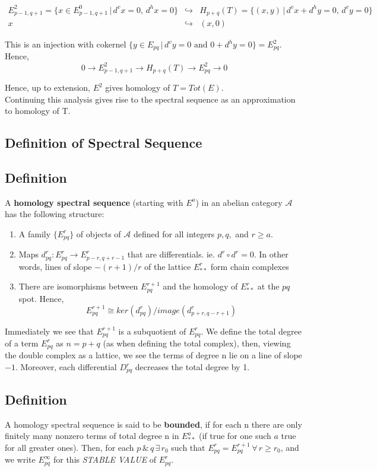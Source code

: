 \begin{eqnarray}
\nonumber E^2_{p-1,q+1} = \{x\in E^0_{p-1,q+1}\, |\, d^v x = 0,\,
d^h x = 0 \} &\hookrightarrow& H_{p+q} (T) = \{(x,y)\, | \, d^v x
+ d^h y =
0,\, d^v y = 0 \}\\
\nonumber x &\hookrightarrow& (x,0)
\end{eqnarray}

This is an injection with cokernel $\{ y\in E_{pq}\, |\, d^v y = 0
\text{ and } 0+d^h y = 0\} = E^2_{pq}$. Hence,
$$0\rightarrow E^2_{p-1,q+1} \rightarrow H_{p+q}(T) \rightarrow
E^2_{pq}\rightarrow 0$$

Hence, up to extension, $E^2$ gives homology of $T=Tot(E)$.\\
Continuing this analysis gives rise to the spectral sequence as an
approximation to homology of T.


\subsection{Definition of Spectral Sequence}\label{df4.5.2}

\subsection*{Definition}
A \textbf{homology spectral sequence} (starting with $E^a$) in an
abelian category $\mathcal A$ has the following structure:
\begin{enumerate}
    \item A family $\{ E^r_{pq}\}$ of objects of $\mathcal A$
    defined for all integers $p,q,$ and $r\geq a$.
    \item Maps $d^r_{pq} : E_{pq}^r \rightarrow E^r_{p-r, q+r-1}$
    that are differentials. ie. $d^r\circ d^r = 0$. In other
    words, lines of slope $-(r+1)/r$ of the lattice $E^r_{**}$
    form chain complexes
    \item There are isomorphisms between $E^{r+1}_{pq}$ and the
    homology of $E^r_{**}$ at the $pq$ spot. Hence,
    $$ E_{pq}^{r+1} \cong ker(d^r_{pq})/image(d^r_{p+r,q-r+1})$$
\end{enumerate}
Immediately we see that $E^{r+1}_{pq}$ is a subquotient of
$E_{pq}^r$. We define the total degree of a term $E_{pq}^r$ as
$n=p+q$ (as when defining the total complex), then, viewing the
double complex as a lattice, we see the terms of degree n lie on a
line of slope $-1$. Moreover, each differential $D_{pq}^r$
decreases the total degree by 1.

\subsection*{Definition}
A homology spectral sequence is said to be \textbf{bounded}, if
for each n there are only finitely many nonzero terms of total
degree n in $E^a_{**}$ (if true for one such $a$ true for all
greater ones). Then, for each $p \,\& \, q\,\exists \, r_0$ such
that $E_{pq}^r = E_{pq}^{r+1}\,\forall \, r\geq r_0$, and we write
$E_{pq}^\infty$ for this \emph{STABLE VALUE} of $E_{pq}^r$.

